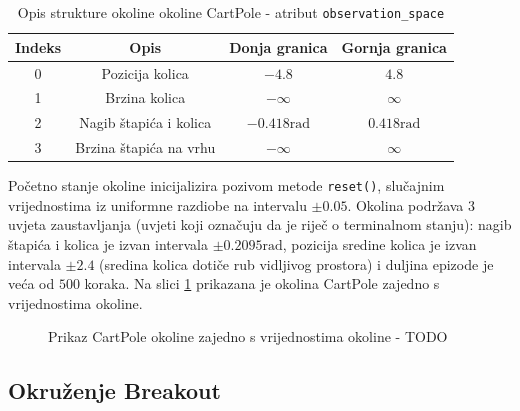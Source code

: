 \begin{table}[ht]
    \centering
    \caption{Opis strukture okoline okoline CartPole - atribut \texttt{observation_space}}
    \begin{tabular}{c c c c}
        \hline
        Indeks & Opis & Donja granica & Gornja granica \\
        \hline
        0 & Pozicija kolica & $-4.8$ & $4.8$ \\
        1 & Brzina kolica & $-\infty$ & $\infty$ \\ 
        2 & Nagib štapića i kolica & $-0.418 \text{rad}$ & $0.418 \text{rad}$ \\
        3 & Brzina štapića na vrhu & $-\infty$ & $\infty$ \\
    \end{tabular}
    \label{table:cart-pole-observation}
\end{table}

Početno stanje okoline inicijalizira pozivom metode \texttt{reset()}, slučajnim vrijednostima iz uniformne razdiobe na intervalu $\pm 0.05$. Okolina podržava 3 uvjeta zaustavljanja (uvjeti koji označuju da je riječ o terminalnom stanju): nagib štapića i kolica je izvan intervala $\pm 0.2095 \text{rad}$, pozicija sredine kolica je izvan intervala $\pm 2.4$ (sredina kolica dotiče rub vidljivog prostora) i duljina epizode je veća od $500$ koraka. Na slici \ref{fig:cart-pole} prikazana je okolina CartPole zajedno s vrijednostima okoline. %

\begin{figure}[H]
    \centering
    \caption{Prikaz CartPole okoline zajedno s vrijednostima okoline - TODO}
    \label{fig:cart-pole}
\end{figure}

\subsection{Okruženje Breakout}


